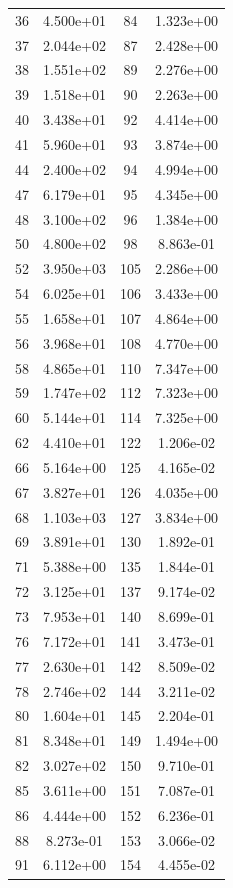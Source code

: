 \documentclass[12pt]{article}
\begin{document}
\begin{longtable}{@{}cccc@{}}
36 & 4.500e+01 & 84 & 1.323e+00 \\
37 & 2.044e+02 & 87 & 2.428e+00 \\
38 & 1.551e+02 & 89 & 2.276e+00 \\
39 & 1.518e+01 & 90 & 2.263e+00 \\
40 & 3.438e+01 & 92 & 4.414e+00 \\
41 & 5.960e+01 & 93 & 3.874e+00 \\
44 & 2.400e+02 & 94 & 4.994e+00 \\
47 & 6.179e+01 & 95 & 4.345e+00 \\
48 & 3.100e+02 & 96 & 1.384e+00 \\
50 & 4.800e+02 & 98 & 8.863e-01 \\
52 & 3.950e+03 & 105 & 2.286e+00 \\
54 & 6.025e+01 & 106 & 3.433e+00 \\
55 & 1.658e+01 & 107 & 4.864e+00 \\
56 & 3.968e+01 & 108 & 4.770e+00 \\
58 & 4.865e+01 & 110 & 7.347e+00 \\
59 & 1.747e+02 & 112 & 7.323e+00 \\
60 & 5.144e+01 & 114 & 7.325e+00 \\
62 & 4.410e+01 & 122 & 1.206e-02 \\
66 & 5.164e+00 & 125 & 4.165e-02 \\
67 & 3.827e+01 & 126 & 4.035e+00 \\
68 & 1.103e+03 & 127 & 3.834e+00 \\
69 & 3.891e+01 & 130 & 1.892e-01 \\
71 & 5.388e+00 & 135 & 1.844e-01 \\
72 & 3.125e+01 & 137 & 9.174e-02 \\
73 & 7.953e+01 & 140 & 8.699e-01 \\
76 & 7.172e+01 & 141 & 3.473e-01 \\
77 & 2.630e+01 & 142 & 8.509e-02 \\
78 & 2.746e+02 & 144 & 3.211e-02 \\
80 & 1.604e+01 & 145 & 2.204e-01 \\
81 & 8.348e+01 & 149 & 1.494e+00 \\
82 & 3.027e+02 & 150 & 9.710e-01 \\
85 & 3.611e+00 & 151 & 7.087e-01 \\
86 & 4.444e+00 & 152 & 6.236e-01 \\
88 & 8.273e-01 & 153 & 3.066e-02 \\
91 & 6.112e+00 & 154 & 4.455e-02 \\

\end{longtable}
\end{document}
